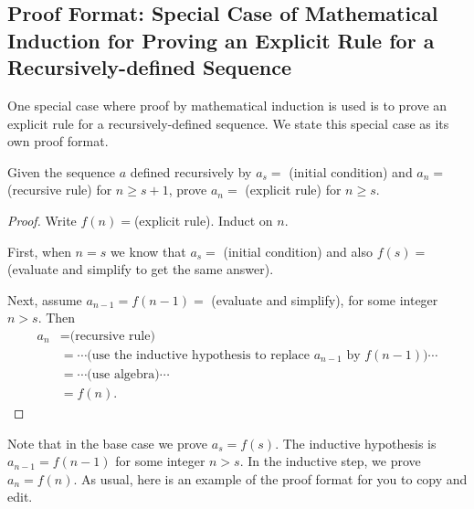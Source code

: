 
\newcommand{\subpffindseq}{Proof Format: Special Case of Mathematical Induction for Proving an Explicit Rule for a Recursively-defined Sequence}
\subsection{\subpffindseq}
\label{sub_pff_verify_explicit_seq}

One special case where proof by mathematical induction is used is to prove an explicit rule for a recursively-defined sequence.  We state this special case as its own proof format.

\begin{pff}
\label{pff_math_ind_seq}
    Given the sequence $a$ defined recursively by $a_s=$ (initial condition) and $a_n=$ (recursive rule) for $n \ge s+1$, prove $a_n=$ (explicit rule) for $n \ge s$.
    \begin{proof}
        Write $f(n) = $(explicit rule).  Induct on $n$.

        First, when $n=s$ we know that $a_s=$ (initial condition) and also $f(s)=$ (evaluate and simplify to get the same answer).

        Next, assume $a_{n-1}=f(n-1)= $ (evaluate and simplify), for some integer $n > s$.  Then 
            \begin{align*}
                a_n & = \text{(recursive rule)} \\
                & = \cdots \text{(use the inductive hypothesis to replace } a_{n-1} \text{ by } f(n-1)) \cdots \\ 
                & = \cdots \text{(use algebra)} \cdots \\
                & = f(n).
            \end{align*}
    \end{proof}
\end{pff}

Note that in the base case we prove $a_s=f(s)$.  The inductive hypothesis is $a_{n-1}=f(n-1)$ for some integer $n > s$.  In the inductive step, we prove $a_n=f(n)$. 
As usual, here is an example of the proof format for you to copy and edit.

